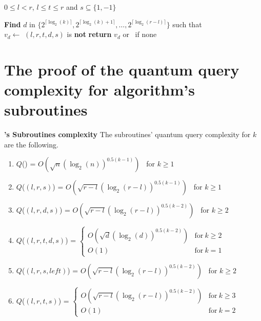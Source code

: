 \begin{appendix}
    \begin{algorithm}[h!]
        \caption{$\FFP{k}(l,r,t,s)$}\label{alg:ffp}
        \begin{algorithmic}
            \Require $0\leq l<r$, $l \leq t \leq r$ and $s \subseteq \{1, -1\}$

            \State \textbf{Find} $d$ in $\{2^{\lceil \log_2(k)\rceil }, 2^{\lceil \log_2(k)+1\rceil },\ldots,2^{\lceil \log_2(r-l)\rceil }\}$
            such that \\
            \hspace*{1cm} $v_d \gets $ $(l,r,t,d,s)$ is \textbf{not} \Null
            \State \textbf{return} $v_d$ or \Null \ if none
        \end{algorithmic}
    \end{algorithm}

    \newpage

    \section{The proof of the quantum query complexity for  algorithm's subroutines}
    \label{proof:complexity_dyckkn}

    \begin{theorem}{\textbf{'s Subroutines complexity}} \label{th:subroutine_complexity}
        The subroutines' quantum query complexity for $k$ are the following.
        \begin{enumerate}
            \item $Q$() = $O\left(\sqrt{n}(\log_2(n))^{0.5(k-1)}\right)$ \ for $k \geq 1$
            \item $Q$($(l,r,s)$) = $O\left(\sqrt{r-l}(\log_2(r-l))^{0.5(k-1)}\right)$ \ for $k \geq 1$
            \item $Q$($(l,r,d,s)$) = $O\left(\sqrt{r-l}(\log_2(r-l))^{0.5(k-2)}\right)$ \ for $k \geq 2$
            \item $Q$($(l, r, t, d, s)$) = $\left\{
                      \begin{array}{ll}
                          O\left(\sqrt{d}(\log_2(d))^{0.5(k-2)}\right) & \textrm{for} \ k \geq 2 \\
                          O(1)                                         & \textrm{for} \  k = 1
                      \end{array}
                      \right.$
            \item $Q$($(l,r,s, left)$) = $O\left(\sqrt{r-l}(\log_2(r-l))^{0.5(k-2)}\right)$ \ for $k \geq 2$
            \item $Q$($(l,r,t,s)$) = $\left\{ \begin{array}{ll}
                          O\left(\sqrt{r-l}(\log_2(r-l))^{0.5(k-2)}\right) & \textrm{for} \ k \geq 3 \\
                          O(1)                                             & \textrm{for} \ k = 2
                      \end{array}
                      \right.$
        \end{enumerate}
    \end{theorem}


\end{appendix}
